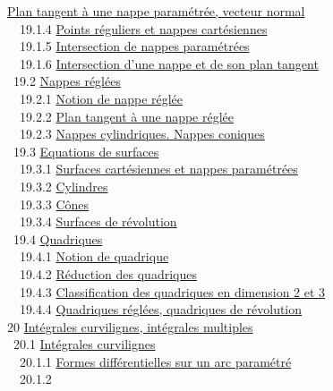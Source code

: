 \documentclass[]{article}
\begin{document}
\href{coursse100.html\#x122-57000019.1.3}{Plan tangent à une nappe
paramétrée, vecteur normal} \\ ~~19.1.4
\href{coursse100.html\#x122-57100019.1.4}{Points réguliers et nappes
cartésiennes} \\ ~~19.1.5
\href{coursse100.html\#x122-57200019.1.5}{Intersection de nappes
paramétrées} \\ ~~19.1.6
\href{coursse100.html\#x122-57300019.1.6}{Intersection d'une nappe et de
son plan tangent} \\ ~19.2
\href{coursse101.html\#x123-57400019.2}{Nappes réglées} \\ ~~19.2.1
\href{coursse101.html\#x123-57500019.2.1}{Notion de nappe réglée} \\
~~19.2.2 \href{coursse101.html\#x123-57600019.2.2}{Plan tangent à une
nappe réglée} \\ ~~19.2.3
\href{coursse101.html\#x123-57700019.2.3}{Nappes cylindriques. Nappes
coniques} \\ ~19.3 \href{coursse102.html\#x124-57800019.3}{Equations de
surfaces} \\ ~~19.3.1 \href{coursse102.html\#x124-57900019.3.1}{Surfaces
cartésiennes et nappes paramétrées} \\ ~~19.3.2
\href{coursse102.html\#x124-58000019.3.2}{Cylindres} \\ ~~19.3.3
\href{coursse102.html\#x124-58100019.3.3}{Cônes} \\ ~~19.3.4
\href{coursse102.html\#x124-58200019.3.4}{Surfaces de révolution} \\
~19.4 \href{coursse103.html\#x125-58300019.4}{Quadriques} \\ ~~19.4.1
\href{coursse103.html\#x125-58400019.4.1}{Notion de quadrique} \\
~~19.4.2 \href{coursse103.html\#x125-58500019.4.2}{Réduction des
quadriques} \\ ~~19.4.3
\href{coursse103.html\#x125-58600019.4.3}{Classification des quadriques
en dimension 2 et 3} \\ ~~19.4.4
\href{coursse103.html\#x125-58700019.4.4}{Quadriques réglées, quadriques
de révolution} \\ 20 \href{coursch21.html\#x126-58800020}{Intégrales
curvilignes, intégrales multiples} \\ ~20.1
\href{coursse104.html\#x127-58900020.1}{Intégrales curvilignes} \\
~~20.1.1 \href{coursse104.html\#x127-59000020.1.1}{Formes
différentielles sur un arc paramétré} \\ ~~20.1.2
\end{document}
